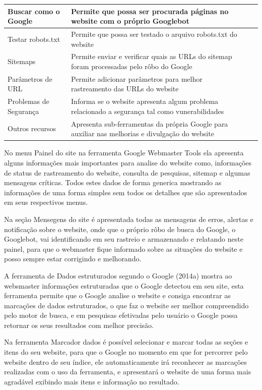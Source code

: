 \documentclass[
	12pt,				%
	openright,			%
	twoside,			%
	a4paper,			%
	english,			%
	french,				%
	spanish,			%
	brazil				%
	]{abntex2}
\begin{document}
\begin{table}[htb]
\begin{center}
\begin{tabular}{p{2.6cm}|p{6.0cm}|p{2.25cm}|p{3.40cm}}
    \hline
    Buscar como o Google & Permite que possa ser procurada páginas no website com o próprio Googlebot \\
    \hline
    Testar robots.txt & Permite que possa ser testado o arquivo robots.txt do website \\
    \hline
    Sitemaps & Permite enviar e verificar quais as URLs do sitemap foram processadas pelo rôbo do Google \\
    \hline
    Parâmetros de URL & Permite adicionar parâmetros para melhor rastreamento das URLs do website \\
    \hline
    Problemas de Segurança & Informa se o website apresenta algum problema relacionado a segurança tal como vunerabilidades \\
    \hline
    Outros recursos & Apresenta sub-ferramentas da própria Google para auxiliar nas melhorias e divulgação do website \\
\end{tabular}
\end{center}
\end{table}

No menu Painel do site na ferramenta Google Webmaster Tools ela apresenta alguns informações mais importantes para analise do website como,  informações de status de rastreamento do website, consulta de pesquisas, sitemap e algumas mensagens críticas. Todos estes dados de forma generica mostrando as informações de uma forma simples sem todos os detalhes que são apresentados em seus respectivos menus.

Na seção Mensegens do site é apresentada todas as mensagens de erros, alertas e notificação sobre o website, onde que o próprio rôbo de busca do Google, o Googlebot, vai identificando em seu rastreio e armazenando e relatando neste painel, para que o webmaster fique informado sobre as situações do website e posso sempre estar corrigindo e melhorando.

A ferramenta de Dados estruturados segundo o Google (2014a) mostra ao websmaster informações estruturadas que o Google detectou em seu site, esta ferramenta permite que o Google analise o website e consiga encontrar as marcações de dados estruturados, o que faz o website ser melhor compreendido pelo motor de busca, e em pesquisas efetivadas pelo usuário o Google possa retornar os seus resultados com melhor precisão.

Na ferramenta Marcador dados é possível selecionar e marcar todas as seções e itens do seu website, para que o Google no momento em que for percorrer pelo website dentro de seu índice, ele automaticamente irá reconhecer as marcações realizadas com o uso da ferramenta, e apresentará o website de uma forma mais agradável exibindo mais itens e informação no resultado.
\end{document}
